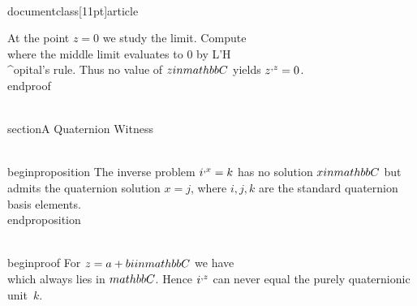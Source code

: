 \\documentclass[11pt]{article}
\begin{document}
At the point $z=0$ we study the limit. Compute
\\[
\\lim_{z \\to 0} z^{\\,z} = \\lim_{z \\to 0} e^{\\,z \\log z} = \\exp\\!\\Big(\\lim_{z \\to 0} z \\log z\\Big) = \\exp(0) = 1,
\\]
where the middle limit evaluates to $0$ by L'H\\^opital's rule. Thus no value of $z \\in \\mathbb{C}$ yields $z^{\\,z} = 0$.
\\end{proof}

\\section{A Quaternion Witness}

\\begin{proposition}
The inverse problem $i^{\\,x} = k$ has no solution $x \\in \\mathbb{C}$ but admits the quaternion solution $x = j$, where $i,j,k$ are the standard quaternion basis elements.
\\end{proposition}

\\begin{proof}
For $z = a + bi \\in \\mathbb{C}$ we have
\\[
i^{\\,z} = e^{\\,z \\log i}
       = \\exp\\!\\left((a+bi)\\,\\frac{i\\pi}{2}\\right)
       = e^{-b\\pi/2}\\big(\\cos(a\\pi/2) + i \\sin(a\\pi/2)\\big),
\\]
which always lies in $\\mathbb{C}$. Hence $i^{\\,z}$ can never equal the purely quaternionic unit~$k$.
\end{document}
